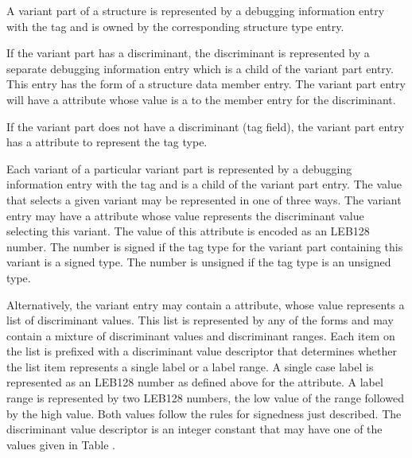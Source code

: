 A variant part of a structure is represented by a debugging
information entry with the 
tag \DWTAGvariantpartTARG{} and is
owned by the corresponding structure type entry.

If the variant part has a discriminant, the discriminant is
\hypertarget{chap:DWATdiscrdiscriminantofvariantpart}{}
represented by a 
separate debugging information entry which
is a child of the variant part entry. This entry has the form
of a 
structure data member entry. The variant part entry will
have a 
\DWATdiscrDEFN{} attribute 
whose value is a  to
the member entry for the discriminant.

If the variant part does not have a discriminant (tag field),
the variant part entry has 
a 
\DWATtype{} attribute to represent
the tag type.

Each variant of a particular variant part is represented by
\hypertarget{chap:DWATdiscrvaluediscriminantvalue}{}
a debugging information entry with the 
tag \DWTAGvariantTARG{}
and is a child of the variant part entry. The value that
selects a given variant may be represented in one of three
ways. The variant entry may have a \DWATdiscrvalueDEFN{} 
attribute
whose value represents the discriminant value selecting 
this variant. The value of this
attribute is encoded as an LEB128 number. The number is signed
if the tag type for the variant part containing this variant
is a signed type. The number is unsigned if the tag type is
an unsigned type.

Alternatively, 
\hypertarget{chap:DWATdiscrlistlistofdiscriminantvalues}{}
the variant entry may contain 
a \DWATdiscrlistDEFN{}
attribute, whose value represents a list of discriminant
values. This list is represented by any of the 
 forms and may contain a 
mixture of discriminant values and discriminant ranges. 
Each item on the list is prefixed with a discriminant value
descriptor that determines whether the list item represents
a single label or a label range. A single case label is
represented as an LEB128 number as defined above for 
the
\DWATdiscrvalue{} 
attribute. A label range is represented by
two LEB128 numbers, the low value of the range followed by the
high value. Both values follow the rules for signedness just
described. The discriminant value descriptor is an integer
constant that may have one of the values given in 
Table .

